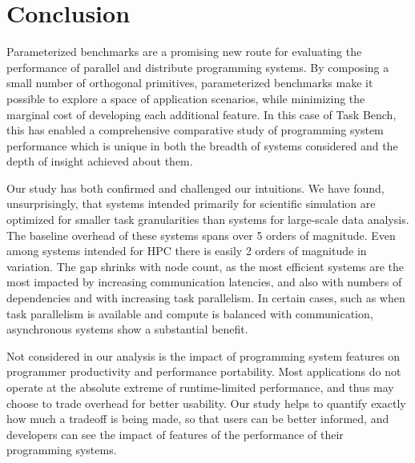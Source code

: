 \section{Conclusion}
\label{sec:conclusion}

Parameterized benchmarks are a promising new route for evaluating the
performance of parallel and distribute programming systems. By
composing a small number of orthogonal primitives, parameterized
benchmarks make it possible to explore a space of application
scenarios, while minimizing the marginal cost of developing each
additional feature. In this case of Task Bench, this has enabled a
comprehensive comparative study of programming system performance
which is unique in both the breadth of systems considered and the
depth of insight achieved about them.

Our study has both confirmed and challenged our intuitions. We have
found, unsurprisingly, that systems intended primarily for scientific
simulation are optimized for smaller task granularities than systems
for large-scale data analysis. The baseline overhead of these systems
spans over 5 orders of magnitude. Even among systems intended for HPC
there is easily 2 orders of magnitude in variation. The gap shrinks
with node count, as the most efficient systems are the most impacted
by increasing communication latencies, and also with numbers of
dependencies and with increasing task parallelism. In certain cases,
such as when task parallelism is available and compute is balanced
with communication, asynchronous systems show a substantial benefit.

Not considered in our analysis is the impact of programming system
features on programmer productivity and performance portability. Most
applications do not operate at the absolute extreme of runtime-limited
performance, and thus may choose to trade overhead for better
usability. Our study helps to quantify exactly how much a tradeoff is
being made, so that users can be better informed, and developers can
see the impact of features of the performance of their programming
systems.
